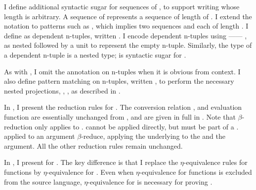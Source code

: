 I define additional syntactic sugar for sequences of , to
support writing  whose length is arbitrary.
A sequence of  \im{\tei\dots} represents a sequence of length
 of  .
I extend the notation to patterns such as \im{\txi:\tAi\dots}, which implies two
sequences  and 
each of length .
I define  as dependent n-tuples, written
\im{\tdnpaire{\tei\dots}{\tnsigmaty{(\txi:\tAi\dots)}}}.
I encode dependent n-tuples using ------
\ie, as nested  followed by a unit  to
represent the empty n-tuple.
Similarly, the type of a dependent n-tuple is a nested 
type; \im{\tnsigmaty{(\txi:\tAi\dots)}} is syntactic sugar for
.

As with , I omit the annotation on n-tuples
\im{\tnpaire{\tei\dots}} when it is obvious from context.
I also define pattern matching on n-tuples, written
\im{\tlete{\tnpaire{\txi\dots}}{\tepr}{\te}}, to perform the necessary nested
projections, \ie,
, as described in .

\FigCCCCRed
In , I present the reduction rules for
.
The conversion relation \im{\tstepjudg[\stepstar]{\tlenv}{\te}{\tepr}}, and
evaluation function \im{\teval{\te}} are essentially unchanged from \slang, and
are given in full in .
Note that \(\beta\)-reduction only applies to .
 cannot be applied directly, but must be part of a .
 applied to an argument \(\beta\)-reduce, applying the underlying
 to the  and the argument.
All the other reduction rules remain unchanged.

\FigCCCCEqv
In , I present  for \tlang.
The key difference is that I replace the \(\eta\)-equivalence rules for
functions by \(\eta\)-equivalence for .
Even when \(\eta\)-equivalence for functions is excluded from the source
language, \(\eta\)-equivalence for  is necessary for proving
.


